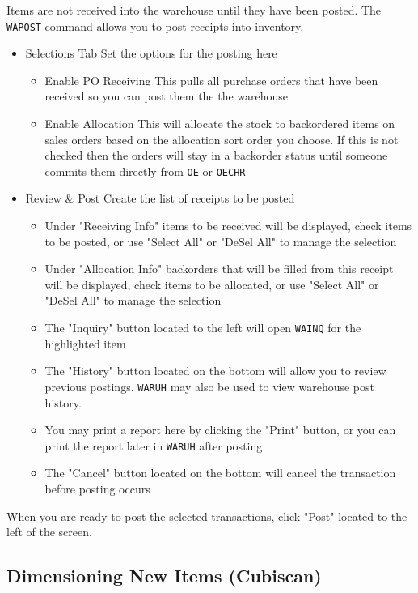 
Items are not received into the warehouse until they have been posted. The \texttt{WAPOST} command allows you to post receipts into inventory.

\begin{itemize}
	\item Selections Tab \textemdash Set the options for the posting here
	\begin{itemize}
		\item Enable PO Receiving \textemdash This pulls all purchase orders that have been received so you can post them the the warehouse
		\item Enable Allocation \textemdash This will allocate the stock to backordered items on sales orders based on the allocation sort order you choose. If this is not checked then the orders will stay in a backorder status until someone commits them directly from \texttt{OE} or \texttt{OECHR}
	\end{itemize}
	\item Review \& Post \textemdash Create the list of receipts to be posted
	\begin{itemize}
		\item Under "Receiving Info" items to be received will be displayed, check items to be posted, or use "Select All" or "DeSel All" to manage the selection
		\item Under "Allocation Info" backorders that will be filled from this receipt will be displayed, check items to be allocated, or use "Select All" or "DeSel All" to manage the selection
		\item The "Inquiry" button located to the left will open \texttt{WAINQ} for the highlighted item
		\item The "History" button located on the bottom will allow you to review previous postings. \texttt{WARUH} may also be used to view warehouse post history.
		\item You may print a report here by clicking the "Print" button, or you can print the report later in \texttt{WARUH} after posting
		\item The "Cancel" button located on the bottom will cancel the transaction before posting occurs
	\end{itemize}
\end{itemize}

When you are ready to post the selected transactions, click "Post" located to the left of the screen.

\subsection{Dimensioning New Items (Cubiscan)}

